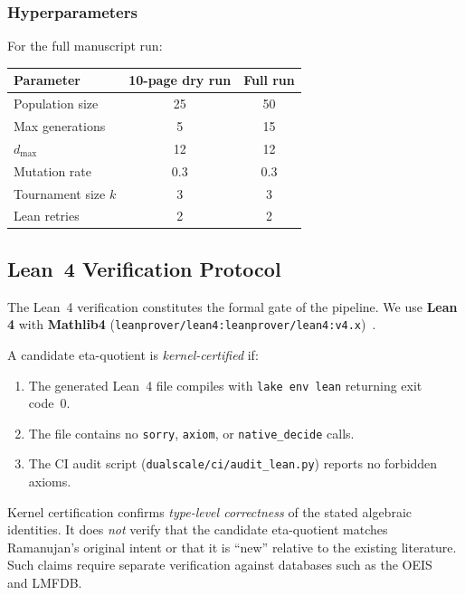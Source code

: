 \subsubsection{Hyperparameters}

For the full manuscript run:
\begin{center}
\begin{tabular}{lcc}
\toprule
\textbf{Parameter} & \textbf{10-page dry run} & \textbf{Full run} \\
\midrule
Population size & 25 & 50 \\
Max generations & 5 & 15 \\
$d_{\max}$ & 12 & 12 \\
Mutation rate & 0.3 & 0.3 \\
Tournament size $k$ & 3 & 3 \\
Lean retries & 2 & 2 \\
\bottomrule
\end{tabular}
\end{center}

\subsection{Lean~4 Verification Protocol}

The Lean~4 verification constitutes the formal gate of the
pipeline.  We use \textbf{Lean 4} with \textbf{Mathlib4}
(\texttt{leanprover/lean4:leanprover/lean4:v4.x})~\cite{moura_lean4,lean4_mathlib}.

\begin{definition}
\label{def:kernel_cert}
A candidate eta-quotient is \emph{kernel-certified} if:
\begin{enumerate}
  \item The generated Lean~4 file compiles with
        \texttt{lake env lean} returning exit code~0.
  \item The file contains no \texttt{sorry}, \texttt{axiom},
        or \texttt{native\_decide} calls.
  \item The CI audit script
        (\texttt{dualscale/ci/audit\_lean.py}) reports
        no forbidden axioms.
\end{enumerate}
\end{definition}

\begin{remark}
Kernel certification confirms \emph{type-level correctness}
of the stated algebraic identities.  It does \emph{not}
verify that the candidate eta-quotient matches Ramanujan's
original intent or that it is ``new'' relative to the
existing literature.  Such claims require separate
verification against databases such as the
OEIS~\cite{ono2004} and LMFDB.
\end{remark}
